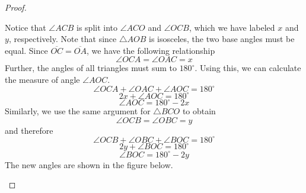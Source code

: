 \begin{proof}
\begin{center}
\end{center}

Notice that $\angle ACB$ is split into $\angle ACO$ and $\angle OCB$, which we have labeled $x$ and $y$, respectively. Note that since $\triangle AOB$ is isosceles, the two base angles must be equal. Since $\overline{OC} = \overline{OA}$, we have the following relationship
\[
\angle OCA = \angle OAC = x
\]
Further, the angles of all triangles must sum to $180^{\circ}$. Using this, we can calculate the measure of angle $\angle AOC$. 
\[
\angle OCA + \angle OAC + \angle AOC = 180^{\circ}
\]
\[
2x + \angle AOC = 180^{\circ}
\]
\[
\angle AOC = 180^{\circ} - 2x
\]
Similarly, we use the same argument for $\triangle BCO$ to obtain
\[
\angle OCB = \angle OBC = y
\]
and therefore
\[
\angle OCB + \angle OBC + \angle BOC = 180^{\circ}
\]
\[
2y + \angle BOC = 180^{\circ}
\]
\[
\angle BOC = 180^{\circ} - 2y
\]
The new angles are shown in the figure below.
\begin{center}
\end{center}
\end{proof}
